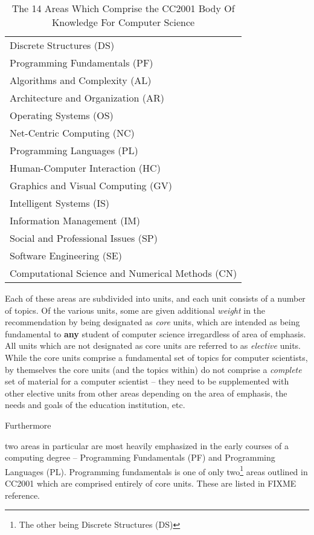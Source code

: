 \begin{table}
	\caption{The 14 Areas Which Comprise the CC2001 Body Of Knowledge For Computer Science}
\begin{tabular}{l}
Discrete Structures (DS) \\
Programming Fundamentals (PF) \\
Algorithms and Complexity (AL) \\
Architecture and Organization (AR) \\
Operating Systems (OS) \\
Net-Centric Computing (NC) \\
Programming Languages (PL) \\
Human-Computer Interaction (HC) \\
Graphics and Visual Computing (GV) \\
Intelligent Systems (IS) \\
Information Management (IM) \\
Social and Professional Issues (SP) \\
Software Engineering (SE) \\
Computational Science and Numerical Methods (CN) \\
\end{tabular}
	\label{tab:CC2001BOK}
\end{table}

Each of these areas are subdivided into units, and each unit consists of a number of topics.  Of the various units, some are given additional \emph{weight} in the recommendation by being designated as \emph{core} units, which are intended as being fundamental to \textbf{any} student of computer science irregardless of area of emphasis.  All units which are not designated as core units are referred to as \emph{elective} units.  While the core units comprise a fundamental set of topics for computer scientists, by themselves the core units (and the topics within) do not comprise a \emph{complete} set of material for a computer scientist -- they need to be supplemented with other elective units from other areas depending on the area of emphasis, the needs and goals of the education institution, etc.

Furthermore


two areas in particular are most heavily emphasized in the early courses of a computing degree -- Programming Fundamentals (PF) and Programming Languages (PL).  Programming fundamentals is one of only two\footnote{The other being Discrete Structures (DS)} areas outlined in CC2001 which are comprised entirely of core units.  These are listed in FIXME reference.


